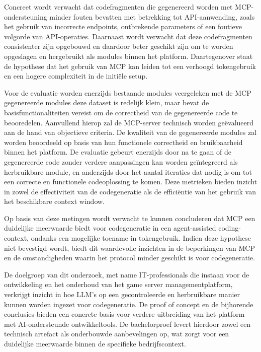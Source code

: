Concreet wordt verwacht dat codefragmenten die gegenereerd worden met MCP-ondersteuning minder fouten bevatten met betrekking tot API-aanwending, zoals het gebruik van incorrecte endpoints, ontbrekende parameters of een foutieve volgorde van API-operaties. Daarnaast wordt verwacht dat deze codefragmenten consistenter zijn opgebouwd en daardoor beter geschikt zijn om te worden opgeslagen en hergebruikt als modules binnen het platform. Daartegenover staat de hypothese dat het gebruik van MCP kan leiden tot een verhoogd tokengebruik en een hogere complexiteit in de initiële setup.

Voor de evaluatie worden enerzijds bestaande modules veergeleken met de MCP gegenereerde modules deze dataset is redelijk klein, maar bevat de basisfunctionaliteiten vereist om de correctheid van de gegenereerde code te beooredelen.
Aanvullend hierop zal de MCP-server technisch worden geëvalueerd aan de hand van objectieve criteria. De kwaliteit van de gegenereerde modules zal worden beoordeeld op basis van hun functionele correctheid en bruikbaarheid binnen het platform. De evaluatie gebeurt enerzijds door na te gaan of de gegenereerde code zonder verdere aanpassingen kan worden geïntegreerd als herbruikbare module, en anderzijds door het aantal iteraties dat nodig is om tot een correcte en functionele codeoplossing te komen. Deze metrieken bieden inzicht in zowel de effectiviteit van de codegeneratie als de efficiëntie van het gebruik van het beschikbare context window.


Op basis van deze metingen wordt verwacht te kunnen concluderen dat MCP een duidelijke meerwaarde biedt voor codegeneratie in een agent-assisted coding-context, ondanks een mogelijke toename in tokengebruik. Indien deze hypothese niet bevestigd wordt, biedt dit waardevolle inzichten in de beperkingen van MCP en de omstandigheden waarin het protocol minder geschikt is voor codegeneratie.

De doelgroep van dit onderzoek, met name IT-professionals die instaan voor de ontwikkeling en het onderhoud van het game server managementplatform, verkrijgt inzicht in hoe LLM’s op een gecontroleerde en herbruikbare manier kunnen worden ingezet voor codegeneratie. De proof of concept en de bijhorende conclusies bieden een concrete basis voor verdere uitbreiding van het platform met AI-ondersteunde ontwikkeltools. De bachelorproef levert hierdoor zowel een technisch artefact als onderbouwde aanbevelingen op, wat zorgt voor een duidelijke meerwaarde binnen de specifieke bedrijfscontext.
